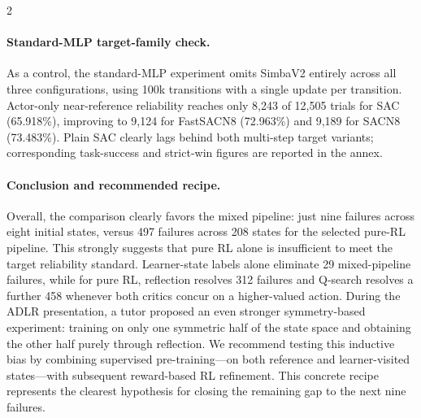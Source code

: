 \begin{multicols}{2}
\paragraph{Standard-MLP target-family check.}
As a control, the standard-MLP experiment omits SimbaV2 entirely across
all three configurations, using 100k transitions with a single update
per transition. Actor-only near-reference reliability reaches only
8,243 of 12,505 trials for SAC (65.918\%), improving to 9,124 for
FastSACN8 (72.963\%) and 9,189 for SACN8 (73.483\%). Plain SAC clearly
lags behind both multi-step target variants; corresponding task-success
and strict-win figures are reported in the annex.

\paragraph{Conclusion and recommended recipe.}
Overall, the comparison clearly favors the mixed pipeline: just nine
failures across eight initial states, versus 497 failures across 208
states for the selected pure-RL pipeline. This strongly suggests that
pure RL alone is insufficient to meet the target reliability standard.
Learner-state labels alone eliminate 29 mixed-pipeline failures, while
for pure RL, reflection resolves 312 failures and Q-search resolves a
further 458 whenever both critics concur on a higher-valued action.
During the ADLR presentation, a tutor proposed an even stronger
symmetry-based experiment: training on only one symmetric half of the
state space and obtaining the other half purely through reflection. We
recommend testing this inductive bias by combining supervised
pre-training—on both reference and learner-visited states—with
subsequent reward-based RL refinement. This concrete recipe represents
the clearest hypothesis for closing the remaining gap to the next nine
failures.
\end{multicols}

\clearpage
\onecolumn
